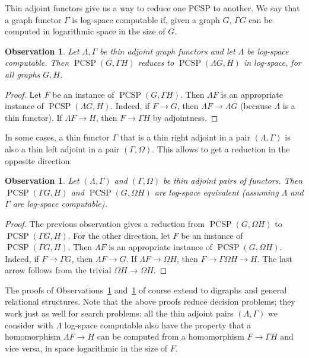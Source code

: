 \documentclass[11pt,a4paper]{scrartcl}
\numberwithin{theorem}{section}
\newtheorem{observation}[theorem]{Observation}
\theoremstyle{definition}
\DeclareMathOperator{\PCSP}{PCSP}
\begin{document}
Thin adjoint functors give us a way to reduce one PCSP to another. We say that a graph functor $\Gamma$ is log-space computable if, given a graph $G$, $\Gamma G$ can be computed in logarithmic space in the size of $G$.

\begin{observation}\label{obs:adj1}
	Let $\Lambda,\Gamma$ be thin adjoint graph functors and let $\Lambda$ be log-space computable.
	Then $\PCSP(G, \Gamma H)$ reduces to $\PCSP(\Lambda G, H)$
	in log-space, for all graphs $G,H$.
\end{observation}
\begin{proof}
	Let $F$ be an instance of $\PCSP(G, \Gamma H)$.
	Then $\Lambda F$ is an appropriate instance of $\PCSP(\Lambda G, H)$.
	Indeed, if $F \to G$, then $\Lambda F \to \Lambda G$ (because $\Lambda$ is a thin functor).
	If $\Lambda F \to H$, then $F \to \Gamma H$ by adjointness.
\end{proof}

In some cases, a thin functor $\Gamma$ that is a thin right adjoint in a pair $(\Lambda, \Gamma)$ is also a thin left adjoint in a pair $(\Gamma,\Omega)$.
This allows to get a reduction in the opposite direction:

\begin{observation}\label{obs:adj2}
	Let $(\Lambda,\Gamma)$ and $(\Gamma,\Omega)$ be thin adjoint pairs of functors.
	Then $\PCSP(\Gamma G, H)$ and $\PCSP(G, \Omega H)$ are log-space equivalent
	(assuming $\Lambda$ and $\Gamma$ are log-space computable).
\end{observation}	
\begin{proof}
	The previous observation gives a reduction from $\PCSP(G, \Omega H)$ to $\PCSP(\Gamma G, H)$. For the other direction, let $F$ be an instance of $\PCSP(\Gamma G, H)$.
	Then $\Lambda F$ is an appropriate instance of $\PCSP(G, \Omega H)$.
	Indeed, if $F \to \Gamma G$, then $\Lambda F \to G$.
	If $\Lambda F \to \Omega H$, then $F \to \Gamma \Omega H \to H$.
	The last arrow follows from the trivial $\Omega H \to \Omega H$.
\end{proof}

The proofs of Observations~\ref{obs:adj1} and~\ref{obs:adj2} of course extend to digraphs and general relational
structures. Note that the above proofs reduce decision problems; they work just as well for search problems: all the thin adjoint pairs $(\Lambda,\Gamma)$ we consider with $\Lambda$ log-space computable also have the property that a homomorphism $\Lambda F \to H$ can be computed from a homomorphism $F \to \Gamma H$ and vice versa, in space logarithmic in the size of $F$.
\end{document}
